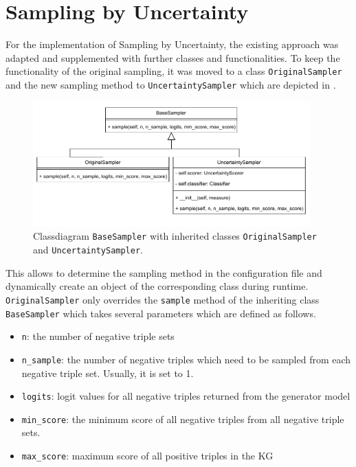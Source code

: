  \section{Sampling by Uncertainty}
 \label{sec:sampling_by_uncertainty}
 
For the implementation of Sampling by Uncertainty, the existing approach was adapted and supplemented with further classes and functionalities.
To keep the functionality of the original sampling, it was moved to a class \texttt{OriginalSampler} and the new sampling method to \texttt{UncertaintySampler} which are depicted in .
\begin{figure}[t]
  \centering
    \includegraphics[width=0.95\textwidth]{figures/classdiagrams/BaseSampler.pdf}
    \caption{Classdiagram \texttt{BaseSampler} with inherited classes \texttt{OriginalSampler} and \texttt{UncertaintySampler}.}
  \label{fig:base_sampler}
\end{figure}
This allows to determine the sampling method in the configuration file and dynamically create an object of the corresponding class during runtime.
\texttt{OriginalSampler} only overrides the \texttt{sample} method of 
the inheriting class \texttt{BaseSampler} which takes several parameters which are defined as follows.
\begin{itemize}
    \item 
    \texttt{n}: the number of negative triple sets
    
    \item 
    \texttt{n\_sample}: 
    the number of negative triples which need to be sampled from each negative triple set.
    Usually, it is set to 1.
    
    \item 
    \texttt{logits}:
    logit values for all negative triples returned from the generator model
    
    \item 
    \texttt{min\_score}:
    the minimum score of all negative triples from all negative triple sets.
    
    \item 
    \texttt{max\_score}:
    maximum score of all positive triples in the \ac{KG}
\end{itemize}
